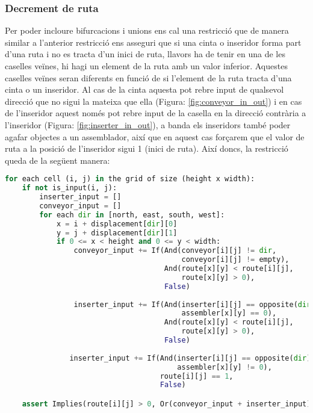 \subsubsection{Decrement de ruta}
Per poder incloure bifurcacions i unions ens cal una restricció que de manera similar a l'anterior restricció ens asseguri que si una cinta o inseridor forma part d'una ruta i no es tracta d'un inici de ruta, llavors ha de tenir en una de les caselles veïnes, hi hagi un element de la ruta amb un valor inferior. Aquestes caselles veïnes seran diferents en funció de si l'element de la ruta tracta d'una cinta o un inseridor. Al cas de la cinta aquesta pot rebre input de qualsevol direcció que no sigui la mateixa que ella (Figura: \ref{fig:conveyor_in_out}) i en cas de l'inseridor aquest només pot rebre input de la casella en la direcció contrària a l'inseridor (Figura: \ref{fig:inserter_in_out}), a banda els inseridors també poder agafar objectes a un assemblador, així que en aquest cas forçarem que el valor de ruta a la posició de l'inseridor sigui 1 (inici de ruta).
Així doncs, la restricció queda de la següent manera:

\begin{lstlisting}[language=Python, caption=Backwards Consistency]
for each cell (i, j) in the grid of size (height x width):
    if not is_input(i, j):
        inserter_input = []
        conveyor_input = []
        for each dir in [north, east, south, west]:
            x = i + displacement[dir][0]
            y = j + displacement[dir][1]
            if 0 <= x < height and 0 <= y < width:
                conveyor_input += If(And(conveyor[i][j] != dir,
                                         conveyor[i][j] != empty),
                                     And(route[x][y] < route[i][j],
                                         route[x][y] > 0),
                                     False)
        
                inserter_input += If(And(inserter[i][j] == opposite(dir),
                                         assembler[x][y] == 0),
                                     And(route[x][y] < route[i][j],
                                         route[x][y] > 0),
                                     False)
        
               inserter_input += If(And(inserter[i][j] == opposite(dir),
                                        assembler[x][y] != 0),
                                    route[i][j] == 1,
                                    False)

    assert Implies(route[i][j] > 0, Or(conveyor_input + inserter_input))
\end{lstlisting}

